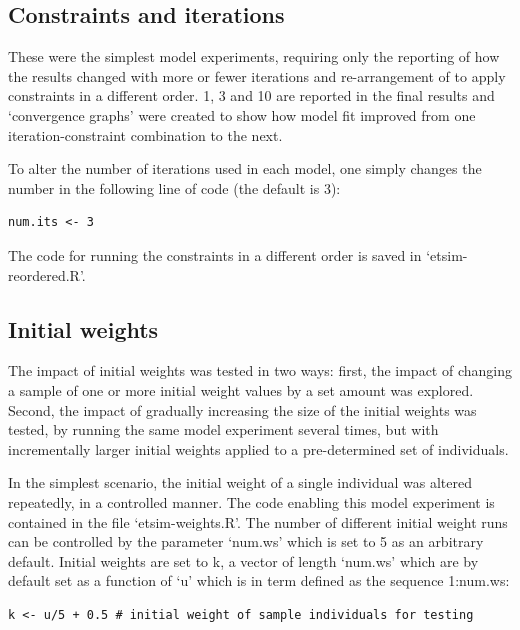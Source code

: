 \documentclass[a4paper,10pt]{article}
\begin{document}
\subsection{Constraints and iterations}
These were the simplest model experiments, requiring only
 the reporting of how the results changed with more or fewer
iterations and re-arrangement of to apply constraints
in a different order. 1, 3 and 10 are reported in the final
results and `convergence graphs' were created to show how model
fit improved from one iteration-constraint combination to the next.

To alter the number of iterations used in each model, one simply
changes the number in the following line of code (the default is 3):

\begin{lstlisting}
num.its <- 3
\end{lstlisting}
 
The code for running the constraints in a different order
is saved in `etsim-reordered.R'.

\subsection{Initial weights}
The impact of initial weights was tested in two ways: first, the impact
 of changing a sample of one or more initial weight values by a set 
amount was explored. Second, the impact of gradually increasing the size of the initial 
weights was tested, by running the same model experiment several times, 
but with incrementally larger initial weights applied to a pre-determined set of individuals.

In the simplest scenario, the
initial weight of a single individual was altered 
repeatedly, in a controlled manner. The code enabling this model experiment 
is contained in the file `etsim-weights.R'. 
The number of different initial weight runs can be controlled by the 
parameter `num.ws' which is set to 5 as an arbitrary default.
Initial weights are set to k, a vector of length `num.ws' which
are by default set as a function of `u' which is in term
defined as the sequence 1:num.ws:

\begin{lstlisting}
k <- u/5 + 0.5 # initial weight of sample individuals for testing 
\end{lstlisting}
\end{document}
